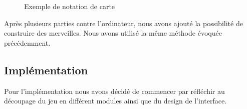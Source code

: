 \documentclass[12pt]{article}
\begin{document}
\begin{figure}[htbp]
\begin{subfigure}{.3\textwidth}
    	    \end{subfigure}
    	    \caption{Exemple de notation de carte}
        \end{figure}
    
    	Après plusieurs parties contre l'ordinateur, nous avons ajouté la possibilité de construire des merveilles. Nous avons utilisé la même méthode évoquée précédemment.
    

    \newpage
	\subsection{Implémentation}
	Pour l'implémentation nous avons décidé de commencer par réfléchir au découpage du jeu
	en différent modules ainsi que du design de l'interface.
\end{document}

